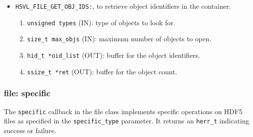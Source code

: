 \begin{mdframed}[style=bgbox]
\begin{itemize}
\item \texttt{H5VL\_FILE\_GET\_OBJ\_IDS:}, to retrieve object identifiers
  in the container:
  \begin{enumerate}
  \item \texttt{unsigned types} (IN): type of objects to look for.
  \item \texttt{size\_t max\_objs} (IN): maximum number of objects to
    open.
  \item \texttt{hid\_t *oid\_list} (OUT): buffer for the object identifiers.
  \item \texttt{ssize\_t *ret} (OUT): buffer for the object count.
  \end{enumerate}

\end{itemize}
\end{mdframed}

\subsubsection{file: specific}
The \texttt{specific} callback in the file class implements specific operations on HDF5 files as specified in the \texttt{specific\_type} parameter. It returns an \texttt{herr\_t} indicating success or failure.\bigskip

